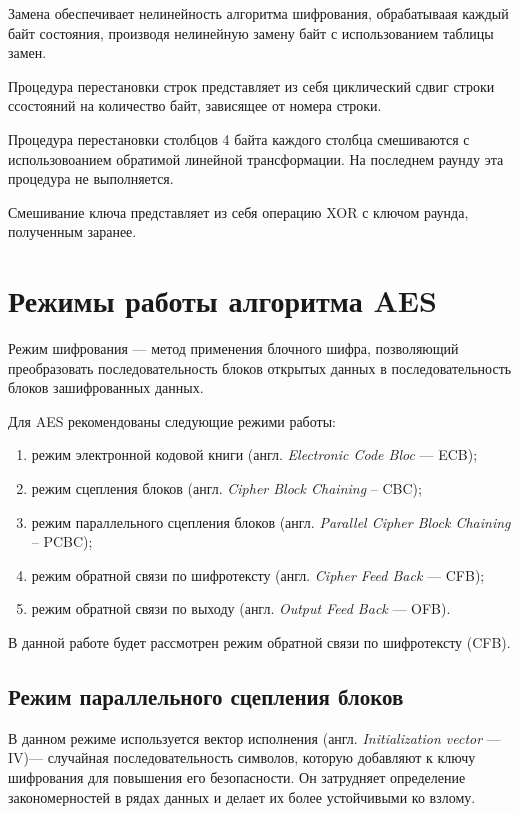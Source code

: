 Замена обеспечивает нелинейность алгоритма шифрования, обрабатываая каждый байт состояния, производя нелинейную замену байт с использованием таблицы замен.

Процедура перестановки строк представляет из себя циклический сдвиг строки ссостояний на количество байт, зависящее от номера строки.

Процедура перестановки столбцов 4 байта каждого столбца смешиваются с использовоанием обратимой линейной трансформации. На последнем раунду эта процедура не выполняется.

Смешивание ключа представляет из себя операцию XOR с ключом раунда, полученным заранее.


\section{Режимы работы алгоритма AES}

Режим шифрования --- метод применения блочного шифра, позволяющий преобразовать последовательность блоков открытых данных в последовательность блоков зашифрованных данных.

Для AES рекомендованы следующие режими работы:
\begin{enumerate}[label=\arabic*)]
	\item режим электронной кодовой книги (англ. \textit{Electronic Code Bloc} --- ECB);
    \item режим сцепления блоков (англ. \textit{Cipher Block Chaining} -- CBC);
	\item режим параллельного сцепления блоков (англ. \textit{Parallel Cipher Block Chaining} -- PCBC);
	\item режим обратной связи по шифротексту (англ. \textit{Cipher Feed Back} --- CFB);
	\item режим обратной связи по выходу (англ. \textit{Output Feed Back} --- OFB).
\end{enumerate}

В данной работе будет рассмотрен режим обратной связи по шифротексту (CFB).

\subsection{Режим параллельного сцепления блоков}

В данном режиме используется вектор исполнения (англ. \textit{Initialization vector} --- IV)--- случайная последовательность символов, которую добавляют к ключу шифрования для повышения его безопасности. Он затрудняет определение закономерностей в рядах данных и делает их более устойчивыми ко взлому.

